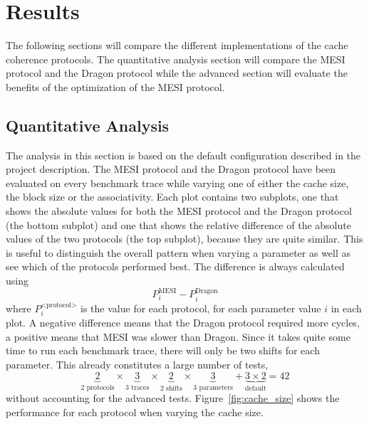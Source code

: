 \section{Results}
The following sections will compare the different implementations of the cache
coherence protocols. The quantitative analysis section will compare the MESI
protocol and the Dragon protocol while the advanced section will evaluate the
benefits of the optimization of the MESI protocol.

\subsection{Quantitative Analysis}


The analysis in this section is based on the default configuration described in
the project description. The MESI protocol and the Dragon protocol have been evaluated
on every benchmark trace while varying one of either the cache size, the block
size or the associativity. Each plot contains two subplots, one that shows the
absolute values for both the MESI protocol and the Dragon protocol (the bottom
subplot) and one that shows the relative difference of the absolute values of
the two protocols (the top subplot), because they are quite similar. This is useful to
distinguish the overall pattern when varying a parameter as well as see which of
the protocols performed best. The difference is always calculated using
\[
    P^\text{MESI}_i - P^\text{Dragon}_i
\]
where $ P^\text{<protocol>}_i $ is the value for each protocol, for each
parameter value $i$ in each plot. A negative difference means that the Dragon protocol
required more cycles, a positive means that MESI was slower than Dragon.
Since it takes quite some time to run each
benchmark trace, there will only be two shifts for each parameter. This already
constitutes a large number of tests,
\[
    \underbrace{2}_\text{2 protocols} \times \underbrace{3}_\text{3 traces} \times \underbrace{2}_\text{2 shifts} \times \underbrace{3}_\text{3 parameters} + \underbrace{3 \times 2}_\text{default} = 42
\]
without accounting for the advanced tests. Figure~\ref{fig:cache_size} shows
the performance for each protocol when varying the cache size.


